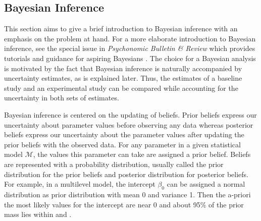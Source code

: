 \documentclass[a4paper]{article}
\newcommand{\model}{\mathcal{M}}
\begin{document}
\subsection*{Bayesian Inference}

This section aims to give a brief introduction to Bayesian inference with an emphasis on the problem at hand. For a more elaborate introduction to Bayesian inference, see the special issue in \emph{Psychonomic Bulletin \& Review} which provides tutorials and guidance for aspiring Bayesians \cite{VandekerckhoveEtAl2018SI}. The choice for a Bayesian analysis is motivated by the fact that Bayesian inference is naturally accompanied by uncertainty estimates, as is explained later. Thus, the estimates of a baseline study and an experimental study can be compared while accounting for the uncertainty in both sets of estimates.

Bayesian inference is centered on the updating of beliefs.
Prior beliefs express our uncertainty about parameter values before observing any data whereas posterior beliefs express our uncertainty about the parameter values after updating the prior beliefs with the observed data.
For any parameter in a given statistical model $\model$, the values this parameter can take are assigned a prior belief.
Beliefs are represented with a probability distribution, usually called the prior distribution for the prior beliefs and posterior distribution for posterior beliefs.
For example, in a multilevel model, the intercept $\beta_0$ can be assigned a normal distribution as prior distribution with mean 0 and variance 1.
Then the a-priori the most likely values for the intercept are near 0 and about 95\% of the prior mass lies within \pgfmathprintnumber{-\zCrit} and \pgfmathprintnumber{\zCrit}.
\end{document}
